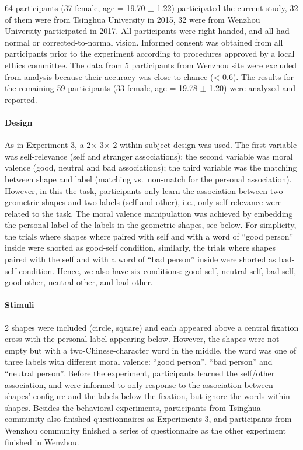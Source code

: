 \documentclass[
  english,
  man]{apa6}
\let\oldparagraph\paragraph
\renewcommand{\paragraph}[1]{\oldparagraph{#1}\mbox{}}
\begin{document}
64 participants (37 female, age = 19.70 \(\pm\) 1.22) participated the current study, 32 of them were from Tsinghua University in 2015, 32 were from Wenzhou University participated in 2017. All participants were right-handed, and all had normal or corrected-to-normal vision. Informed consent was obtained from all participants prior to the experiment according to procedures approved by a local ethics committee. The data from 5 participants from Wenzhou site were excluded from analysis because their accuracy was close to chance (\textless{} 0.6). The results for the remaining 59 participants (33 female, age = 19.78 \(\pm\) 1.20) were analyzed and reported.

\hypertarget{design-3}{%
\paragraph{Design}\label{design-3}}

As in Experiment 3, a 2× 3× 2 within-subject design was used. The first variable was self-relevance (self and stranger associations); the second variable was moral valence (good, neutral and bad associations); the third variable was the matching between shape and label (matching vs.~non-match for the personal association).
However, in this the task, participants only learn the association between two geometric shapes and two labels (self and other), i.e., only self-relevance were related to the task. The moral valence manipulation was achieved by embedding the personal label of the labels in the geometric shapes, see below. For simplicity, the trials where shapes where paired with self and with a word of \enquote{good person} inside were shorted as good-self condition, similarly, the trials where shapes paired with the self and with a word of \enquote{bad person} inside were shorted as bad-self condition. Hence, we also have six conditions: good-self, neutral-self, bad-self, good-other, neutral-other, and bad-other.

\hypertarget{stimuli-4}{%
\paragraph{Stimuli}\label{stimuli-4}}

2 shapes were included (circle, square) and each appeared above a central fixation cross with the personal label appearing below. However, the shapes were not empty but with a two-Chinese-character word in the middle, the word was one of three labels with different moral valence: \enquote{good person}, \enquote{bad person} and \enquote{neutral person}. Before the experiment, participants learned the self/other association, and were informed to only response to the association between shapes' configure and the labels below the fixation, but ignore the words within shapes. Besides the behavioral experiments, participants from Tsinghua community also finished questionnaires as Experiments 3, and participants from Wenzhou community finished a series of questionnaire as the other experiment finished in Wenzhou.
\end{document}
